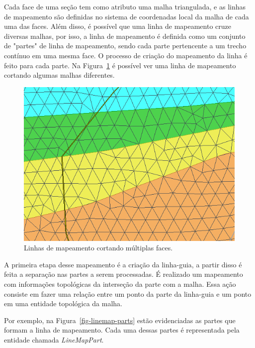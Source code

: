 Cada face de uma seção tem como atributo uma malha triangulada, e as linhas de mapeamento são definidas no sistema de coordenadas local da malha de cada uma das faces. Além disso, é possível que uma linha de mapeamento cruze diversas malhas, por isso, a linha de mapeamento é definida como um conjunto de "partes" de linha de mapeamento, sendo cada parte pertencente a um trecho contínuo em uma mesma face. O processo de criação do mapeamento da linha é feito para cada parte. Na Figura~\ref{fig-linemap-malhas} é possível ver uma linha de mapeamento cortando algumas malhas diferentes.

\begin{figure} [h]
  \begin{center}
    \includegraphics[width=350pt]{images/fig-linhas-de-mapeamento-malhas}
    \caption{Linhas de mapeamento cortando múltiplas faces.}\label{fig-linemap-malhas}
  \end{center}
\end{figure}

A primeira etapa desse mapeamento é a criação da linha-guia, a partir disso é feita a separação nas partes a serem processadas. É realizado um mapeamento com informações topológicas da interseção da parte com a malha. Essa ação consiste em fazer uma relação entre um ponto da parte da linha-guia e um ponto em uma entidade topológica da malha.

Por exemplo, na Figura~\ref{fig-linemap-parts} estão evidenciadas as partes que formam a linha de mapeamento. Cada uma dessas partes é representada pela entidade chamada \textit{LineMapPart}.

